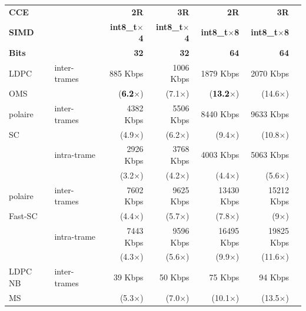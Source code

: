\documentclass[../main.tex]{subfiles}
\begin{document}
\begin{table}[!tb]
    \footnotesize
    \centering
    \begin{tabular}{llrrrrr}
    \toprule                    %
    \textbf{CCE}     &       & \textbf{2R}  & \textbf{3R}  & \textbf{2R}  & \textbf{3R}      \\
    \textbf{SIMD}   &       & \textbf{int8\_t$\times$4} & \textbf{int8\_t$\times$4} & \textbf{int8\_t$\times$8} & \textbf{int8\_t$\times$8} \\
        \textbf{Bits}    &       & \textbf{32}& \textbf{32} & \textbf{64} & \textbf{64} \\
        \cmidrule(l){1-6}
        LDPC    & inter-trames  & 885 Kbps  &1006 Kbps  & 1879 Kbps & 2070 Kbps \\
        OMS     &               & (\textcolor{black}{\textbf{6.2}}$\times$)  & (7.1$\times$)  &             (\textcolor{black}{\textbf{13.2}}$\times$) & (14.6$\times$) \\
        \cmidrule(l){1-6} 
        polaire      & inter-trames  & 4382 Kbps     &5506 Kbps      & 8440 Kbps     & 9633 Kbps     \\
        SC      &               & (4.9$\times$)   & (6.2$\times$)   & (9.4$\times$)   & (10.8$\times$)  \\
                & intra-trame   & 2926 Kbps     & 3768 Kbps     & 4003 Kbps     & 5063 Kbps     \\
                &               & (3.2$\times$)   & (4.2$\times$)   & (4.4$\times$)   & (5.6$\times$)   \\
        \cmidrule(l){1-6}
        polaire      & inter-trames  &7602 Kbps      &9625 Kbps      & 13430 Kbps    & 15212 Kbps    \\
        Fast-SC     &               & (4.4$\times$)   & (5.7$\times$)   & (7.8$\times$)   & (9$\times$)   \\
                & intra-trame   & 7443 Kbps     & 9596 Kbps     & 16495 Kbps    & 19825 Kbps    \\
                &               & (4.3$\times$)   & (5.6$\times$)   & (9.9$\times$)   & (11.6$\times$)  \\
        \cmidrule(l){1-6} 
        LDPC NB & inter-trames  & 39 Kbps       & 50  Kbps      & 75 Kbps       & 94 Kbps       \\
        MS      &               & (5.3$\times$)   & (7.0$\times$)   & (10.1$\times$)  & (13.5$\times$)  \\

\end{tabular}
\end{table}
\end{document}
